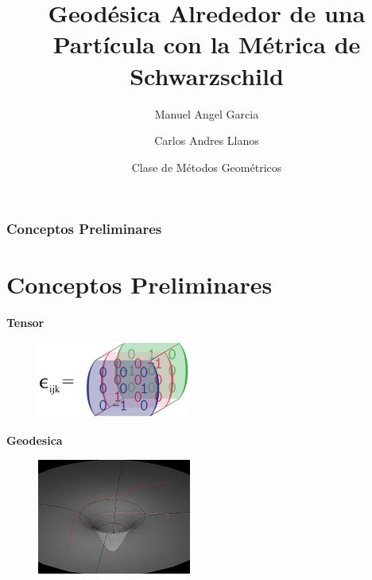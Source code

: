 \documentclass{beamer}
\title[Geodesica en Espacio de Minkowski] %
{Geodésica Alrededor de una Partícula con la Métrica de Schwarzschild}
\author[Garcia, Raisuke] %
{Manuel Angel Garcia\inst{1} \and Carlos Andres Llanos\inst{1}}
\institute[] %
{
  \inst{1}%
  Facultad de Física\\
  Universidad Nacional de Colombia
}
\date[2023] %
{Clase de Métodos Geométricos}
\begin{document}
\frame{\titlepage}


\begin{frame}
  \tableofcontents
\end{frame}


\begin{frame}
  \frametitle{Conceptos Preliminares}
  \section{Conceptos Preliminares}
  \textbf{Tensor }
  \begin{figure}
    \includegraphics[width=0.45\textwidth]{tensor.png}
  \end{figure}
  
  \textbf{Geodesica }
  \begin{figure}
    \includegraphics[width=0.45\textwidth]{geodesicas.png}
  \end{figure}
\end{frame}

\end{document}
